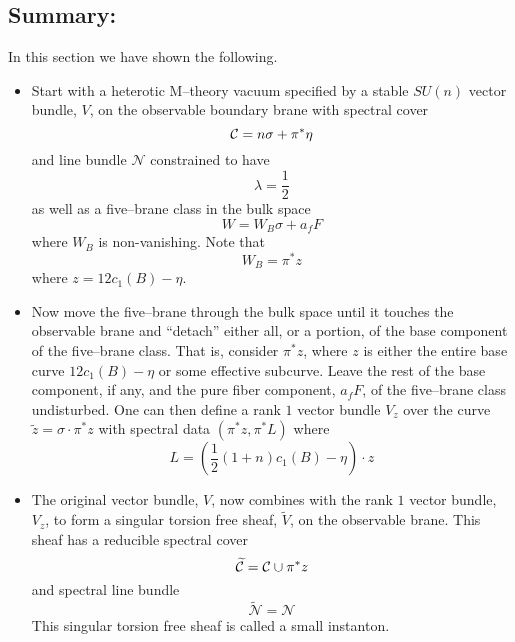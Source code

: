 \documentclass[a4paper,12pt]{article}
\numberwithin{equation}{section}
\def\cC{{\mathcal C}}
\def\cN{{\mathcal N}}
\theoremstyle{plain}
\begin{document}
\subsection*{Summary:}

In this section we have shown the following.

\begin{itemize}

\item Start with a heterotic M--theory vacuum specified by
a stable $SU(n)$ vector bundle, $V$, on the observable boundary
brane with spectral cover
\begin{equation}
{\cal{C}}= n\sigma+ \pi^{*}\eta
\label{eq:91}
\end{equation}
and line bundle $\cN$ constrained to have
\begin{equation}
\lambda=\frac{1}{2}
\label{eq:92}
\end{equation}
as well as a five--brane class in the bulk space 
\begin{equation}
W=W_{B}\sigma +a_{f}F
\label{eq:93}
\end{equation}
where $W_{B}$ is non-vanishing. Note that
\begin{equation}
W_{B}=\pi^{*}z
\label{eq:94}
\end{equation}
where $z=12c_{1}(B)-\eta$.  


\item Now move the five--brane through the bulk space until it touches 
the observable brane and ``detach'' either
all, or a portion, of the base component of the five--brane class.
That is, consider $\pi^{*}z$, where $z$ is either the entire base curve
$12c_{1}(B)-\eta$ or some effective subcurve.
Leave the rest of the base component, if any, and the pure fiber component, 
$a_{f}F$, of the five--brane class undisturbed. One can then define a 
rank $1$ vector bundle $V_{z}$ over the curve $\tilde{z}=\sigma \cdot
\pi^{*}z$ with spectral data $(\pi^{*}z,\pi^{*}L)$
where
\begin{equation}
L=(\frac{1}{2}(1+n)c_{1}(B)-\eta) \cdot z
\label{eq:95}
\end{equation}

\item The original vector bundle, $V$, now combines with the rank $1$ vector
bundle, $V_{z}$, to form a singular torsion free sheaf, 
$\widetilde{V}$, on the observable
brane. This sheaf has a reducible spectral cover
\begin{equation}
\widetilde{\cC}={\cal{C}} \cup \pi^{*}z
\label{eq:96}
\end{equation}
and spectral line bundle
\begin{equation}
\widetilde{\cN}=\cN
\label{eq:97}
\end{equation}
This singular torsion free sheaf is called a small instanton.


\end{itemize}
\end{document}
